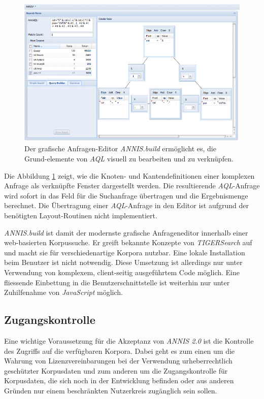 \begin{figure}[H]
	\centering
	\includegraphics*[width=1.0\textwidth]{figures/DA/ANNIS_build.jpg}
	\caption{Der grafische Anfragen-Editor \emph{ANNIS.build} ermöglicht es, die Grund-elemente von \emph{AQL} visuell zu bearbeiten und zu verknüpfen.}\label{fig:ANNIS_build}
\end{figure}

Die Abbildung \ref{fig:ANNIS_build} zeigt, wie die Knoten- und Kantendefinitionen einer komplexen Anfrage als verknüpfte Fenster dargestellt werden. Die resultierende \emph{AQL}-Anfrage wird sofort in das Feld für die Suchanfrage übertragen und die Ergebnismenge berechnet. Die Übertragung einer \emph{AQL}-Anfrage in den Editor ist aufgrund der benötigten Layout-Routinen nicht implementiert.

\emph{ANNIS.build} ist damit der modernste grafische Anfrageneditor innerhalb einer web-basierten Korpussuche. Er greift bekannte Konzepte von \emph{TIGERSearch} auf und macht sie für verschiedenartige Korpora nutzbar. Eine lokale Installation beim Benutzer ist nicht notwendig. Diese Umsetzung ist allerdings nur unter Verwendung von komplexem, client-seitig ausgeführtem Code möglich. Eine fliessende Einbettung in die Benutzerschnittstelle ist weiterhin nur unter Zuhilfenahme von \emph{JavaScript} möglich.

\subsection{Zugangskontrolle}\label{sec:Authentifizierung}

Eine wichtige Voraussetzung für die Akzeptanz von \emph{ANNIS 2.0} ist die Kontrolle des Zugriffs auf die verfügbaren Korpora. Dabei geht es zum einen um die Wahrung von Lizenzvereinbarungen bei der Verwendung urheberrechtlich geschützter Korpusdaten und zum anderen um die Zugangskontrolle für Korpusdaten, die sich noch in der Entwicklung befinden oder aus anderen Gründen nur einem beschränkten Nutzerkreis zugänglich sein sollen.

